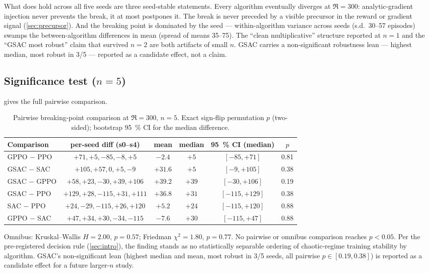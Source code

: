 What does hold across all five seeds are three seed-stable statements. Every algorithm eventually diverges at
$\Re=300$: analytic-gradient injection never prevents the break, it at most
postpones it. The break is never preceded by a visible precursor in the
reward or gradient signal (\cref{sec:precursor}). And the breaking point is
dominated by the seed --- within-algorithm variance across seeds (s.d.\
30--57 episodes) swamps the between-algorithm differences in mean (spread of
means 35--75). The ``clean multiplicative'' structure reported at $n=1$ and the ``GSAC most
robust'' claim that survived $n=2$ are both artifacts of small $n$. GSAC
carries a non-significant robustness lean --- highest median, most robust in
3/5 --- reported as a candidate effect, not a claim.

\subsection{Significance test ($n=5$)}
\label{sec:sig}

 gives the full pairwise comparison.

\begin{table}[t]
\centering
\caption{Pairwise breaking-point comparison at $\Re=300$, $n=5$. Exact
sign-flip permutation $p$ (two-sided); bootstrap \SI{95}{\percent} CI for the
median difference.}
\label{tab:sig}
\small
\begin{tabular}{|l|c|c|c|c|c|}
\hline
Comparison & per-seed diff (s0--s4) & mean & median & \SI{95}{\percent} CI (median) & $p$ \\
\hline
GPPO $-$ PPO  & $+71,+5,-85,-8,+5$      & $-2.4$  & $+5$  & $[-85,+71]$   & 0.81 \\
\hline
GSAC $-$ SAC  & $+105,+57,0,+5,-9$      & $+31.6$ & $+5$  & $[-9,+105]$   & 0.38 \\
\hline
GSAC $-$ GPPO & $+58,+23,-30,+39,+106$  & $+39.2$ & $+39$ & $[-30,+106]$  & 0.19 \\
\hline
GSAC $-$ PPO  & $+129,+28,-115,+31,+111$& $+36.8$ & $+31$ & $[-115,+129]$ & 0.38 \\
\hline
SAC $-$ PPO   & $+24,-29,-115,+26,+120$ & $+5.2$  & $+24$ & $[-115,+120]$ & 0.88 \\
\hline
GPPO $-$ SAC  & $+47,+34,+30,-34,-115$  & $-7.6$  & $+30$ & $[-115,+47]$  & 0.88 \\
\hline
\end{tabular}
\end{table}

Omnibus: Kruskal--Wallis $H=2.00$, $p=0.57$; Friedman $\chi^2=1.80$,
$p=0.77$. No pairwise or omnibus comparison reaches $p<0.05$. Per
the pre-registered decision rule (\cref{sec:intro}), the finding stands as
no statistically separable ordering of chaotic-regime training
stability by algorithm. GSAC's non-significant lean (highest median and
mean, most robust in 3/5 seeds, all pairwise $p\in[0.19,0.38]$) is reported
as a candidate effect for a future larger-$n$ study.


